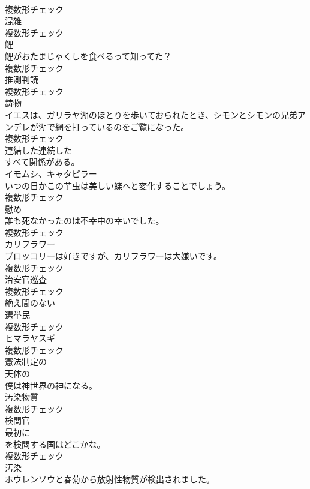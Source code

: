 \documentclass[8pt]{extreport}
\begin{document}
\begin{CJK}{UTF8}{min}
\\	複数形チェック
\\	[名詞]	混雑	
\\	複数形チェック
\\	[名詞]	鯉	
\\	鯉がおたまじゃくしを食べるって知ってた？	
\\	複数形チェック
\\	[名詞]	推測判読	
\\	複数形チェック
\\	[名詞]	鋳物	
\\	イエスは、ガリラヤ湖のほとりを歩いておられたとき、シモンとシモンの兄弟アンデレが湖で網を打っているのをご覧になった。	
\\	複数形チェック
\\	[形容詞]	連結した連続した	
\\	すべて関係がある。	
\\	[名詞]	イモムシ、キャタピラー	
\\	いつの日かこの芋虫は美しい蝶へと変化することでしょう。	
\\	複数形チェック
\\	[名詞]	慰め	
\\	誰も死なかったのは不幸中の幸いでした。	
\\	複数形チェック
\\	[名詞]	カリフラワー	
\\	ブロッコリーは好きですが、カリフラワーは大嫌いです。	
\\	複数形チェック
\\	[名詞]	治安官巡査	
\\	複数形チェック
\\	[形容詞]	絶え間のない	
\\	[名詞]	選挙⺠	
\\	複数形チェック
\\	[名詞]	ヒマラヤスギ	
\\	複数形チェック
\\	[形容詞]	憲法制定の	
\\	[形容詞]	天体の	
\\	僕は神世界の神になる。	
\\	[名詞]	汚染物質	
\\	複数形チェック
\\	[名詞]	検閲官	
\\	最初に
\\	を検閲する国はどこかな。	
\\	複数形チェック
\\	[名詞]	汚染	
\\	ホウレンソウと春菊から放射性物質が検出されました。	

\end{CJK}
\end{document}
